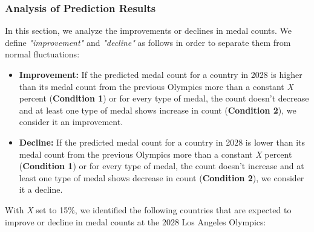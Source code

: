 \documentclass{mcmthesis}
\begin{document}
\subsubsection{Analysis of Prediction Results}

In this section, we analyze the improvements or declines in medal counts. We define \textit{"improvement"} and \textit{"decline"} as follows in order to separate them from normal fluctuations:

\begin{itemize}
    \item \textbf{Improvement:} If the predicted medal count for a country in 2028 is higher than its medal count from the previous Olympics more than a constant \textit{X} percent (\textbf{Condition 1}) or for every type of medal, the count doesn't decrease and at least one type of medal shows increase in count (\textbf{Condition 2}), we consider it an improvement.
    \item \textbf{Decline:} If the predicted medal count for a country in 2028 is lower than its medal count from the previous Olympics more than a constant \textit{X} percent (\textbf{Condition 1}) or for every type of medal, the count doesn't increase and at least one type of medal shows decrease in count (\textbf{Condition 2}), we consider it a decline.
\end{itemize}

With \textit{X} set to 15\%, we identified the following countries that are expected to improve or decline in medal counts at the 2028 Los Angeles Olympics:
\end{document}
